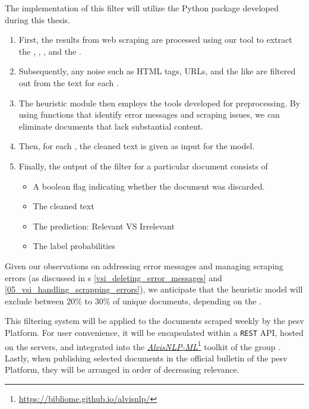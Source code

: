 The implementation of this filter will utilize the Python package developed during this thesis.


\begin{enumerate}

    \item First, the results from web scraping are processed using our tool to extract the \trafilaturaTitle{}, \trafilaturaAbstract{}, \trafilaturaFulltext{}, and the \translationTitle{}.
    
    \item Subsequently, any noise such as HTML tags, URLs, and the like are filtered out from the text for each \contentType{}.

    \item The heuristic module then employs the tools developed for preprocessing. By using functions that identify error messages and scraping issues, we can eliminate documents that lack substantial content.

    \item  Then, for each \contentType{}, the cleaned text is given as input for the \textclassification{} model.

    \item Finally, the output of the filter for a particular document consists of
    \begin{itemize}
        \item A boolean flag indicating whether the document was discarded.
        \item The cleaned text
        \item The prediction: Relevant VS Irrelevant
        \item The label probabilities
    \end{itemize}


\end{enumerate}

Given our observations on addressing error messages and managing scraping errors (as discussed in \headerName{}s \ref{vsi_deleting_error_messages} and \ref{05_vsi_handling_scrapping_errors}), we anticipate that the heuristic model will exclude between 20\% to 30\% of unique documents, depending on the \contentType{}.

This filtering system will be applied to the documents scraped weekly by the \gls{pesv} Platform. 
For user convenience, it will be encapsulated within a \texttt{REST} API, hosted on the \MAIAGE{} servers, and integrated into the \href{https://bibliome.github.io/alvisnlp/)}{\emph{AlvisNLP-ML}}\footnote{\url{https://bibliome.github.io/alvisnlp/}} toolkit of the \bibliome{} group . 
Lastly, when publishing selected documents in the official bulletin of the \gls{pesv} Platform, they will be arranged in order of decreasing relevance.



